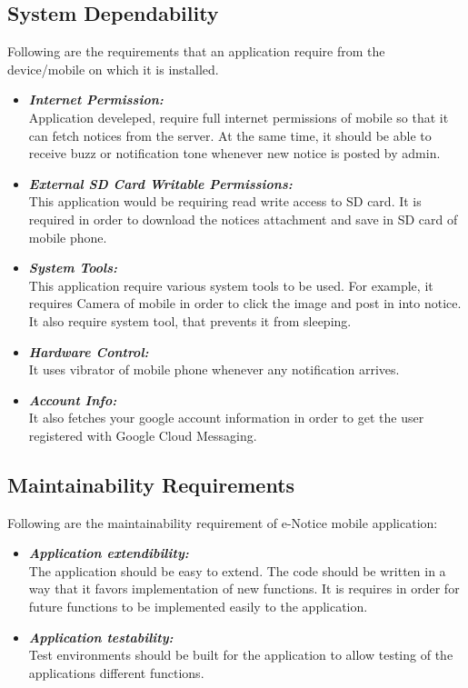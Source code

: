 \subsection{System Dependability}
Following are the requirements that an application require from the device/mobile on which it is installed.
\begin{itemize}
\item \textbf{\emph{Internet Permission:}}\\
Application develeped, require full internet permissions of mobile so that it can fetch notices from the server.
At the same time, it should be able to receive buzz or notification tone whenever new notice is posted by admin.

\item \textbf{\emph{External SD Card Writable Permissions:}}\\
This application would be requiring read write access to SD card. It is required in order to download the notices attachment and save
in SD card of mobile phone.

\item \textbf{\emph{System Tools:}}\\
This application require various system tools to be used. For example, it requires Camera of mobile in order to click the image and
post in into notice. It also require system tool, that prevents it from sleeping.

\item \textbf{\emph{Hardware Control:}}\\
It uses vibrator of mobile phone whenever any notification arrives.

\item \textbf{\emph{Account Info:}}\\
It also fetches your google account information in order to get the user registered with Google Cloud Messaging.
\end{itemize}

\subsection{Maintainability Requirements}
Following are the maintainability requirement of e-Notice mobile application:
\begin{itemize}

\item \textbf{\emph{Application extendibility:}}\\
The application should be easy to extend. The code should be written in a way that it favors
implementation of new functions. It is requires in order for future functions to be implemented easily to the application.

\item \textbf{\emph{Application testability:}}\\
Test environments should be built for the application to allow testing of the applications different
functions.

\end{itemize}

